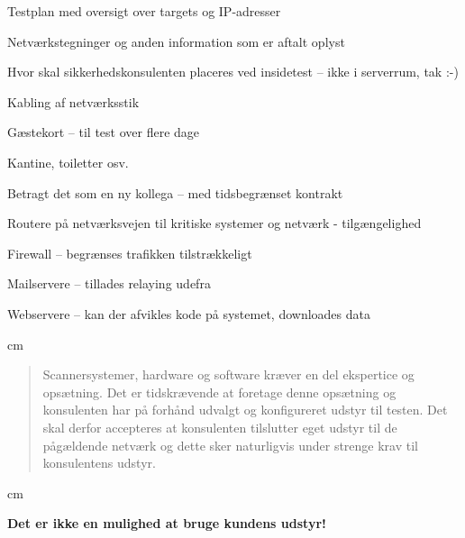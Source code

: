 \documentclass[Screen16to9,17pt]{foils}
\begin{document}

\begin{list1}
\item Testplan med oversigt over targets og IP-adresser
\item Netværkstegninger og anden information som er aftalt oplyst
\item Hvor skal sikkerhedskonsulenten placeres ved insidetest -- ikke i serverrum, tak :-)
\item Kabling af netværksstik
\item Gæstekort -- til test over flere dage
\item Kantine, toiletter osv.
\end{list1}
\vskip 1cm
\centerline{Betragt det som en ny kollega -- med tidsbegrænset kontrakt}



\begin{list2}
\item Routere på netværksvejen til kritiske systemer og netværk -
  tilgængelighed
\item Firewall -- begrænses trafikken tilstrækkeligt
\item Mailservere -- tillades relaying udefra
\item Webservere -- kan der afvikles kode på systemet, downloades data
\end{list2}



 cm
\begin{quote}
Scannersystemer, hardware og software kræver en del ekspertice og
opsætning. Det er tidskrævende at foretage denne opsætning og
konsulenten har på forhånd udvalgt og konfigureret udstyr til testen.
Det skal derfor accepteres at konsulenten tilslutter eget udstyr til
de pågældende netværk og dette sker naturligvis under strenge krav til
konsulentens udstyr.
\end{quote}
 cm
\centerline{\bf Det er ikke en mulighed at bruge kundens udstyr!}

\end{document}
